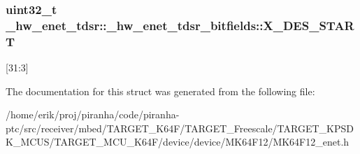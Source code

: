 \subsubsection[{\texorpdfstring{X\+\_\+\+D\+E\+S\+\_\+\+S\+T\+A\+RT}{X_DES_START}}]{\setlength{\rightskip}{0pt plus 5cm}uint32\+\_\+t \+\_\+hw\+\_\+enet\+\_\+tdsr\+::\+\_\+hw\+\_\+enet\+\_\+tdsr\+\_\+bitfields\+::\+X\+\_\+\+D\+E\+S\+\_\+\+S\+T\+A\+RT}\hypertarget{struct__hw__enet__tdsr_1_1__hw__enet__tdsr__bitfields_ab0ee9c4a173de8406817c24580ddd5a4}{}\label{struct__hw__enet__tdsr_1_1__hw__enet__tdsr__bitfields_ab0ee9c4a173de8406817c24580ddd5a4}
\mbox{[}31\+:3\mbox{]} 

The documentation for this struct was generated from the following file\+:\begin{DoxyCompactItemize}
\item 
/home/erik/proj/piranha/code/piranha-\/ptc/src/receiver/mbed/\+T\+A\+R\+G\+E\+T\+\_\+\+K64\+F/\+T\+A\+R\+G\+E\+T\+\_\+\+Freescale/\+T\+A\+R\+G\+E\+T\+\_\+\+K\+P\+S\+D\+K\+\_\+\+M\+C\+U\+S/\+T\+A\+R\+G\+E\+T\+\_\+\+M\+C\+U\+\_\+\+K64\+F/device/device/\+M\+K64\+F12/M\+K64\+F12\+\_\+enet.\+h\end{DoxyCompactItemize}

